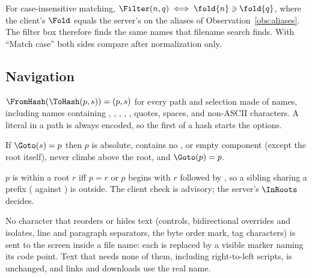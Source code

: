 \begin{law}
\label{law:filter}
For case-insensitive matching, $\Filter(n,q)\iff \fold{n}\ni\fold{q}$, where the
client's $\Fold$ equals the server's on the aliases of Observation~\ref{obs:aliases}.
The filter box therefore finds the same names that filename search finds.  With
``Match case'' both sides compare after normalization only.
\end{law}

\subsection{Navigation}

\begin{law}
\label{law:hash}
$\FromHash(\ToHash(p,s))=(p,s)$ for every path and selection made of names,
including names containing \code{\%}, \code{\#}, , \code{\&}, \code{=},
quotes, spaces, and non-ASCII characters.  A literal  in a path is always
encoded, so the first  of a hash starts the options.
\end{law}

\begin{law}
\label{law:goto}
If $\Goto(s)=p$ then $p$ is absolute, contains no ,  or empty
component (except the root itself), never climbs above the root, and
$\Goto(p)=p$.
\end{law}

\begin{law}
\label{law:roots-prefix}
$p$ is within a root $r$ iff $p=r$ or $p$ begins with $r$ followed by \code{/},
so a sibling sharing a prefix ( against ) is
outside.  The client check is advisory; the server's $\InRoots$ decides.
\end{law}

\begin{law}
\label{law:display}
No character that reorders or hides text (controls, bidirectional overrides and
isolates, line and paragraph separators, the byte order mark, tag characters) is
sent to the screen inside a file name: each is replaced by a visible marker naming
its code point.  Text that needs none of them, including right-to-left scripts, is
unchanged, and links and downloads use the real name.
\end{law}

